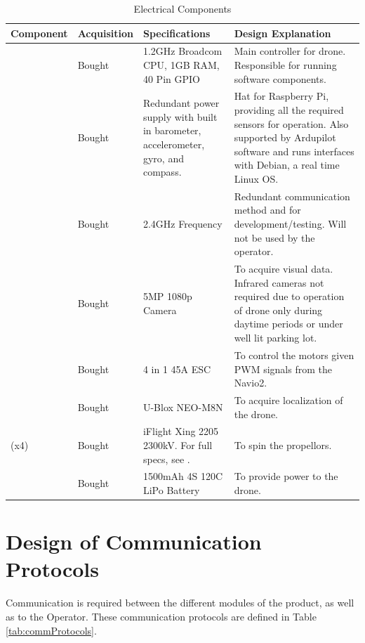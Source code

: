 \documentclass[12pt, titlepage]{article}
\begin{document}
\begin{table}[!h]
\begin{center}
\caption {Electrical Components}
\label{tab:elecComponents}
\begin{tabular}{ | m{2.7cm} | m{1.9cm} | m{4cm} | m{6.4cm} | } 
\hline
Component & Acquisition & Specifications & Design Explanation \\
\hline
\nameref{Raspberry Pi 3B} & Bought & 1.2GHz Broadcom CPU, 1GB RAM, 40 Pin GPIO & 
    Main controller for drone. Responsible for running software components. \\
\hline
\nameref{Navio2} & Bought & Redundant power supply with built in barometer, accelerometer, gyro, and compass. & 
    Hat for Raspberry Pi, providing all the required sensors for operation. Also supported by Ardupilot software and runs interfaces with Debian, a real time Linux OS. \\
\hline
\nameref{Radio Antenna and Receiver} & Bought & 2.4GHz Frequency & 
    Redundant communication method and for development/testing. Will not be used by the operator. \\
\hline
\nameref{Camera} & Bought & 5MP 1080p Camera & 
    To acquire visual data. Infrared cameras not required due to operation of drone only during daytime periods or under well lit parking lot. \\
\hline
\nameref{Electronic Speed Controller} & Bought & 4 in 1 45A ESC & 
    To control the motors given PWM signals from the Navio2. \\
\hline
\nameref{GPS} & Bought & U-Blox NEO-M8N & 
    To acquire localization of the drone. \\
\hline
\nameref{Brushless DC Motor} (x4) & Bought & iFlight Xing 2205 2300kV. For full specs, see \nameref{motorSpecs}. & 
    To spin the propellors. \\
\hline
\nameref{LiPo Battery} & Bought & 1500mAh 4S 120C LiPo Battery & 
    To provide power to the drone. \\
\hline
\end{tabular}
\end{center}
\end{table}

\clearpage

\section{Design of Communication Protocols}
\label{sec:commProtocols}

Communication is required between the different modules of the product, as well as to the Operator. These communication protocols are defined in Table \ref{tab:commProtocols}.
\end{document}
